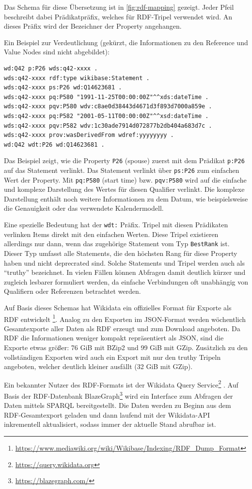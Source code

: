 Das Schema für diese Übersetzung ist in \cref{fig:rdf-mapping} gezeigt.
Jeder Pfeil beschreibt dabei Prädikatpräfix, welches für RDF-Tripel verwendet wird.
An dieses Präfix wird der Bezeichner der Property angehangen.

Ein Beispiel zur Verdeutlichung (gekürzt, die Informationen zu den Reference und Value Nodes sind nicht abgebildet):
\begin{lstlisting}[language=SPARQL]
wd:Q42 p:P26 wds:q42-xxxx .
wds:q42-xxxx rdf:type wikibase:Statement .
wds:q42-xxxx ps:P26 wd:Q14623681 .
wds:q42-xxxx pq:P580 "1991-11-25T00:00:00Z"^^xds:dateTime .
wds:q42-xxxx pqv:P580 wdv:c8ae0d38443d4671d3f893d7000a859e .
wds:q42-xxxx pq:P582 "2001-05-11T00:00:00Z"^^xsd:dateTime .
wds:q42-xxxx pqv:P582 wdv:1c30ade7914d072877b2db404a683d7c .
wds:q42-xxxx prov:wasDerivedFrom wdref:yyyyyyyy .
wd:Q42 wdt:P26 wd:Q14623681 .
\end{lstlisting}
Das Beispiel zeigt, wie die Property \verb|P26| (spouse) zuerst mit dem Prädikat \verb|p:P26| auf das Statement verlinkt.
Das Statement verlinkt über \verb|ps:P26| zum einfachen Wert der Property.
Mit \verb|pq:P580| (start time) bzw. \verb|pqv:P580| wird auf die einfache und komplexe Darstellung des Wertes für diesen Qualifier verlinkt.
Die komplexe Darstellung enthält noch weitere Informationen zu dem Datum, wie beispielsweise die Genauigkeit oder das verwendete Kalendermodell.

Eine spezielle Bedeutung hat der \verb|wdt:| Präfix.
Tripel mit diesen Prädikaten verlinken Items direkt mit den einfachen Werten.
Diese Tripel existieren allerdings nur dann, wenn das zugehörige Statement vom Typ \verb|BestRank| ist.
Dieser Typ umfasst alle Statements, die den höchsten Rang für diese Property haben und nicht deprecrated sind.
Solche Statements und Tripel werden auch als "`truthy"' bezeichnet.
In vielen Fällen können Abfragen damit deutlich kürzer und zugleich lesbarer formuliert werden, da einfache Verbindungen oft unabhängig von Qualifiern oder Referenzen betrachtet werden.

Auf Basis dieses Schemas hat Wikidata ein offizielles Format für Exporte als RDF entwickelt \footnote{\url{https://www.mediawiki.org/wiki/Wikibase/Indexing/RDF_Dump_Format}}.
Analog zu den Exporten im JSON-Format werden wöchentlich Gesamtexporte aller Daten als RDF erzeugt und zum Download angeboten.
Da RDF die Informationen weniger kompakt repräsentiert als JSON, sind die Exporte etwas größer: 76 GiB mit BZip2 und 99 GiB mit GZip.
Zusätzlich zu den vollständigen Exporten wird auch ein Export mit nur den truthy Tripeln angeboten, welcher deutlich kleiner ausfällt (32 GiB mit GZip).

Ein bekannter Nutzer des RDF-Formats ist der Wikidata Query Service\footnote{\url{https://query.wikidata.org}} \cite{wd-sparql}.
Auf Basis der RDF-Datenbank BlazeGraph\footnote{\url{https://blazegraph.com/}} wird ein Interface zum Abfragen der Daten mittels SPARQL bereitgestellt.
Die Daten werden zu Beginn aus dem RDF-Gesamtexport geladen und dann laufend mit der Wikidata-API inkrementell aktualisiert, sodass immer der aktuelle Stand abrufbar ist.